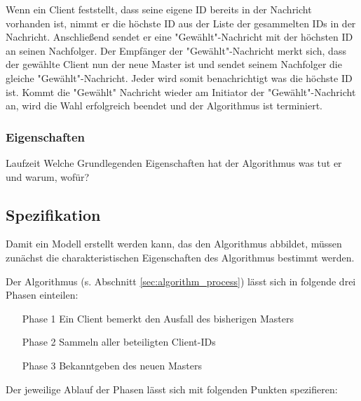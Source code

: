 Wenn ein Client feststellt, dass seine eigene ID bereits in der Nachricht vorhanden ist, nimmt er die höchste ID aus der Liste der gesammelten IDs in der Nachricht. Anschließend sendet er eine "Gewählt"-Nachricht mit der höchsten ID an seinen Nachfolger. Der Empfänger der "Gewählt"-Nachricht merkt sich, dass der gewählte Client nun der neue Master ist und sendet seinem Nachfolger die gleiche "Gewählt"-Nachricht. Jeder wird somit benachrichtigt was die höchste ID ist. Kommt die "Gewählt" Nachricht wieder am Initiator der "Gewählt"-Nachricht an, wird die Wahl erfolgreich beendet und der Algorithmus ist terminiert.

\subsubsection*{Eigenschaften}
 Laufzeit
Welche Grundlegenden Eigenschaften hat der Algorithmus
was tut er und warum, wofür?

\subsection{Spezifikation}
Damit ein Modell erstellt werden kann, das den Algorithmus abbildet, müssen zunächst die charakteristischen Eigenschaften des Algorithmus bestimmt werden.

Der Algorithmus (s. Abschnitt \ref{sec:algorithm_process}) lässt sich in folgende drei Phasen einteilen:
\begin{itemize}
\item[Phase 1] Ein Client bemerkt den Ausfall des bisherigen Masters
\item[Phase 2] Sammeln aller beteiligten Client-IDs
\item[Phase 3] Bekanntgeben des neuen Masters
\end{itemize}

Der jeweilige Ablauf der Phasen lässt sich mit folgenden Punkten spezifieren:

